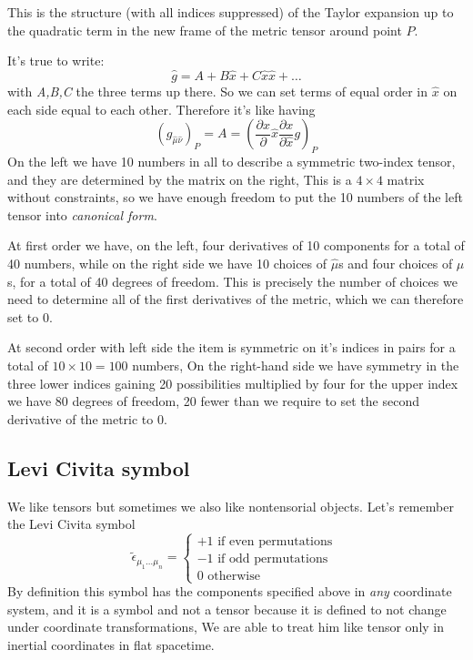 This is the structure (with all indices suppressed) of the Taylor expansion up to the quadratic term in the new frame of the metric tensor around point $P$. \par
It's true to write:
\[
	\hat{g} = A+ B \hat{x} + C \hat{x}\hat{x} + \ldots 
\]
with \emph{A,B,C} the three terms up there. So we can set terms of equal order in $\hat{x}$ on each side equal to each other. Therefore it's like having
\[
	\left( g_{\hat{\mu }\hat{\nu }} \right)_{P} = A = \left( \frac{\partial x}{\partial } \hat{x} \frac{\partial x}{\partial \hat{x}} g  \right)_{P}
\]
On the left we have 10 numbers in all to describe a symmetric two-index tensor, and they are determined by the matrix on the right, This is a $4\times 4$ matrix without constraints, so we have enough freedom to put the 10 numbers of the left tensor into \emph{canonical form}.\par
At first order we have, on the left, four derivatives of 10 components for a total of 40 numbers, while on the right side we have 10 choices of $\hat{\mu }$s and four choices of $\mu$s, for a total of 40 degrees of freedom. This is precisely the number of choices we need to determine all of the first derivatives of the metric, which we can therefore set to 0. \par
At second order with left side the item is symmetric on it's indices in pairs for a total of $10 \times 10 = 100$ numbers, On the right-hand side we have symmetry in the three lower indices gaining 20 possibilities multiplied by four for the upper index we have 80 degrees of freedom, 20 fewer than we require to set the second derivative of the metric to 0.\par

\subsection{Levi Civita symbol}
We like tensors but sometimes we also like nontensorial objects.
Let's remember the Levi Civita symbol 
\[
	\tilde{\epsilon}_{\mu _{1}\ldots \mu _{n }} = \begin{cases}
	+1 \text{ if even permutations } \\
	-1 \text{ if odd permutations } \\
	0 \text{ otherwise }
	\end{cases}	
\]
By definition this symbol has the components specified above in \emph{any} coordinate system, and it is a symbol and not a tensor because it is defined to not change under coordinate transformations, We are able to treat him like tensor only in inertial coordinates in flat spacetime.

